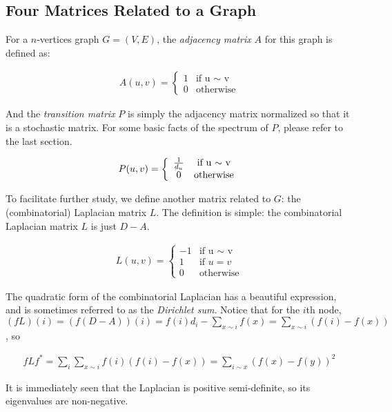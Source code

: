 \subsection{Four Matrices Related to a Graph}
For a $n$-vertices graph $G=(V, E)$, the \emph{adjacency matrix} $A$
for this graph is defined as:

\begin{eqnarray*}
A(u,v)=\left\{
\begin{array}{cc}
1 & \textrm{if u $\sim$ v}\\
0 & \textrm{otherwise}
\end{array}
\right.
\end{eqnarray*}

And the \emph{transition matrix} $P$ is simply the adjacency matrix
normalized so that it is a stochastic matrix. For some basic facts
of the spectrum of $P$, please refer to the last section.

\begin{eqnarray*}
P(u,v)=\left\{
\begin{array}{cc}
1\over d_u & \textrm{if u $\sim$ v}\\
0 & \textrm{otherwise}
\end{array}
\right.
\end{eqnarray*}

To facilitate further study, we define another matrix related to
$G$: the (combinatorial) Laplacian matrix $L$. The definition is
simple: the combinatorial Laplacian matrix $L$ is just $D-A$.

\begin{eqnarray*}
L(u,v)=\left\{
\begin{array}{cc}
-1 & \textrm{if u $\sim$ v}\\
1 & \textrm{if $u=v$} \\
0 & \textrm{otherwise}
\end{array}
\right.
\end{eqnarray*}

The quadratic form of the combinatorial Laplacian has a beautiful
expression, and is sometimes referred to as the \emph{Dirichlet
sum}. Notice that for the $i$th node,
$(fL)(i)=(f(D-A))(i)=f(i)d_i-\sum_{x\sim i}f(x)=\sum_{x\sim
i}(f(i)-f(x))$, so

\begin{eqnarray*}
fLf^*=\sum_i \sum_{x\sim i}f(i)(f(i)-f(x))=\sum_{i\sim
x}(f(x)-f(y))^2
\end{eqnarray*}

It is immediately seen that the Laplacian is positive semi-definite,
so its eigenvalues are non-negative.

